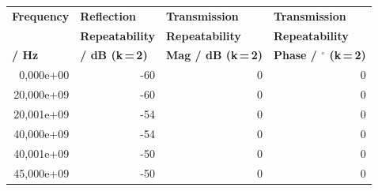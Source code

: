 \begin{longtable}{rrrr}
\multicolumn{1}{l}{\textbf{Frequency}} & \multicolumn{1}{l}{\textbf{Reflection}} & \multicolumn{1}{l}{\textbf{Transmission}} & \multicolumn{1}{l}{\textbf{Transmission}}\\
\multicolumn{1}{l}{\textbf{}} & \multicolumn{1}{l}{\textbf{Repeatability}} & \multicolumn{1}{l}{\textbf{Repeatability}} & \multicolumn{1}{l}{\textbf{Repeatability}}\\
\multicolumn{1}{l}{\textbf{/ Hz}} & \multicolumn{1}{l}{\textbf{/ dB (k\,=\,2)}} & \multicolumn{1}{l}{\textbf{Mag / dB (k\,=\,2)}} & \multicolumn{1}{l}{\textbf{Phase / $\mathbf{^{\circ}}$ (k\,=\,2)}}\\
\hline
\endhead
0,000e+00 & -60 & 0 & 0\\
20,000e+09 & -60 & 0 & 0\\
20,001e+09 & -54 & 0 & 0\\
40,000e+09 & -54 & 0 & 0\\
40,001e+09 & -50 & 0 & 0\\
45,000e+09 & -50 & 0 & 0\\
\end{longtable}
